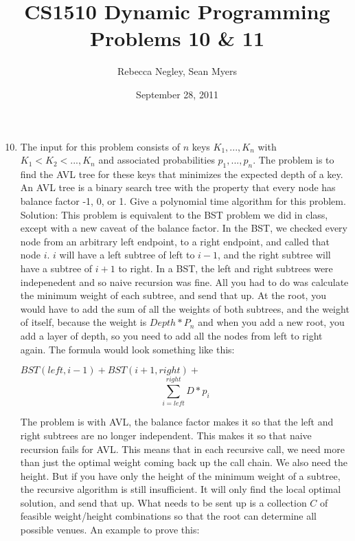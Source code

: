 \documentclass{article}
\title{CS1510  Dynamic Programming Problems 10 \& 11}
\author{Rebecca Negley, Sean Myers}
\date{September 28, 2011}
\begin{document}
\maketitle

\begin{enumerate}
\setcounter{enumi}{9}
\item The input for this problem consists of $n$ keys $K_{1},...,K_{n}$ with $K_{1} < K_{2} < ..., K_{n}$ and associated
\newline probabilities $p_{1},...,p_{n}$. The problem is to find the AVL tree for these keys that minimizes the expected
\newline depth of a key. An AVL tree is a binary search tree with the property that every node has balance
\newline factor -1, 0, or 1. Give a polynomial time algorithm for this problem.
\newline
\newline Solution: This problem is equivalent to the BST problem we did in class, except with a new caveat of the balance factor. In the BST, we checked every node from an arbitrary left endpoint, to a right endpoint, and called that node $i$. $i$ will have a left subtree of left to $i-1$, and the right subtree will have a subtree of $i+1$ to right. In a BST, the left and right subtrees were indepenedent and so naive recursion was fine. All you had to do was calculate the minimum weight of each subtree, and send that up. At the root, you would have to add the sum of all the weights of both subtrees, and the weight of itself, because the weight is $Depth*P_{n}$ and when you add a new root, you add a layer of depth, so you need to add all the nodes from left to right again. The formula would look something like this:

$BST(left, i-1) + BST(i+1, right) +$ $$\sum\limits_{i=left}^{right}D*p_{i}$$

The problem is with AVL, the balance factor makes it so that the left and right subtrees are no longer independent. This makes it so that naive recursion fails for AVL. This means that in each recursive call, we need more than just the optimal weight coming back up the call chain. We also need the height. But if you have only the height of the minimum weight of a subtree, the recursive algorithm is still insufficient. It will only find the local optimal solution, and send that up. What needs to be sent up is a collection $C$ of feasible weight/height combinations so that the root can determine all possible venues. An example to prove this:


\end{enumerate}
\end{document}
